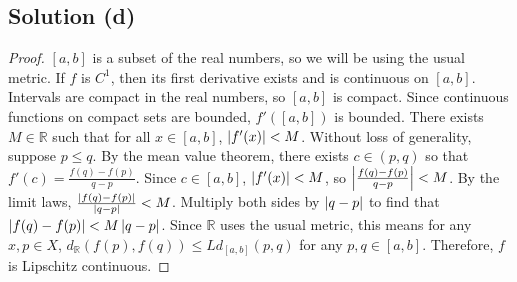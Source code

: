 \documentclass[11pt]{article}
\begin{document}
    \subsection{Solution (d)}
        \begin{proof}
            $[a,b]$ is a subset of the real numbers, so we will be using the usual metric.
            If $f$ is $C^1$, then its first derivative exists and is continuous on $[a,b]$.
            Intervals are compact in the real numbers, so $[a,b]$ is compact.
            Since continuous functions on compact sets are bounded, $f'([a,b])$ is bounded.
            There exists $M \in \mathbb{R}$ such that for all $x \in [a,b]$, $\left| f'(x) \right| < M$.
            Without loss of generality, suppose $p \leq q$.
            By the mean value theorem, there exists $c \in (p,q)$ so that $f'(c) = \frac{f(q) - f(p)}{q - p}$.
            Since $c \in [a,b]$, $\left| f'(x) \right| < M$, so $\left| \frac{f(q) - f(p)}{q - p} \right| < M$.
            By the limit laws, $\frac{\left| f(q) - f(p) \right|}{\left| q - p \right|} < M$.
            Multiply both sides by $\left| q - p \right|$ to find that $\left| f(q) - f(p) \right| < M \left| q - p \right|$.
            Since $\mathbb{R}$ uses the usual metric, this means for any $x,p \in X$, $d_\mathbb{R} (f(p),f(q)) \leq Ld_{[a,b]}(p,q)$ for any $p,q \in [a,b]$.
            Therefore, $f$ is Lipschitz continuous.
        \end{proof}
\end{document}
